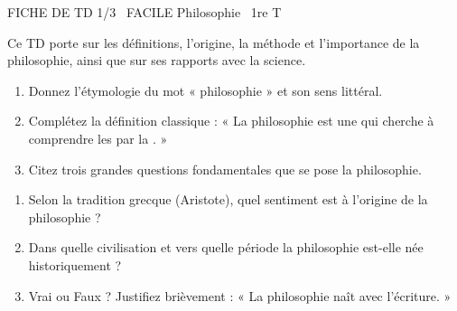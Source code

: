 \documentclass[11pt]{article}
\begin{document}
\begin{tcolorbox}[enhanced,colback=popink,colframe=popink,arc=10pt,boxrule=0pt,left=12pt,right=12pt,top=9pt,bottom=9pt]
{\color{white}\popxbold\small FICHE DE TD 1/3 \textbullet\ FACILE \hfill Philosophie \textbullet\ 1re T\par}
\end{tcolorbox}
\vspace{4pt}
Ce TD porte sur les définitions, l'origine, la méthode et l'importance de la philosophie, ainsi que sur ses rapports avec la science.

\begin{exercice}
\begin{enumerate}
    \item Donnez l'étymologie du mot « philosophie » et son sens littéral.
    \item Complétez la définition classique : « La philosophie est une \underline{\hspace{4cm}} qui cherche à comprendre les \underline{\hspace{4cm}} par la \underline{\hspace{4cm}}. »
    \item Citez trois grandes questions fondamentales que se pose la philosophie.
\end{enumerate}
\end{exercice}

\begin{exercice}
\begin{enumerate}
    \item Selon la tradition grecque (Aristote), quel sentiment est à l'origine de la philosophie ?
    \item Dans quelle civilisation et vers quelle période la philosophie est-elle née historiquement ?
    \item Vrai ou Faux ? Justifiez brièvement : « La philosophie naît avec l'écriture. »
\end{enumerate}
\end{exercice}
\end{document}
